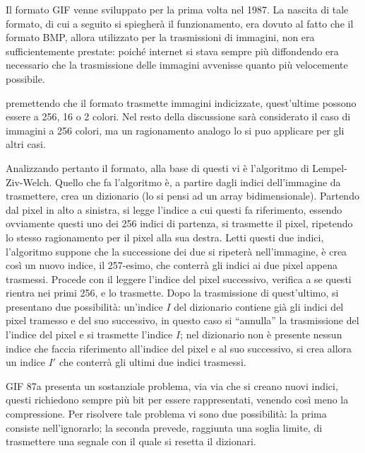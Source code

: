 \documentclass{subfiles}
\begin{document}
Il formato GIF venne sviluppato per la prima volta nel 1987. La nascita di tale formato, di cui a seguito si spiegherà il funzionamento,
era dovuto al fatto che il formato BMP, allora utilizzato per la trasmissioni di immagini, non era sufficientemente prestate:
poiché internet si stava sempre più diffondendo era necessario che la trasmissione delle immagini avvenisse quanto più velocemente possibile.

\begin{Note*}
    premettendo che il formato trasmette immagini indicizzate, quest'ultime possono essere a 256, 16 o 2 colori.
    Nel resto della discussione sarà considerato il caso di immagini a 256 colori, ma un ragionamento analogo lo si puo applicare per gli altri casi.
\end{Note*}

Analizzando pertanto il formato, alla base di questi vi è l'algoritmo di Lempel-Ziv-Welch.
Quello che fa l'algoritmo è, a partire dagli indici dell'immagine da trasmettere, crea un dizionario (lo si pensi ad un array bidimensionale).
Partendo dal pixel in alto a sinistra, si legge l'indice a cui questi fa riferimento, essendo ovviamente questi uno dei 256 indici di partenza,
si trasmette il pixel, ripetendo lo stesso ragionamento per il pixel alla sua destra. Letti questi due indici,
l'algoritmo suppone che la successione dei due si ripeterà nell'immagine, è crea così un nuovo indice, il 257-esimo, che conterrà gli indici ai due pixel appena trasmessi.
Procede con il leggere l'indice del pixel successivo, verifica a se questi rientra nei primi 256, e lo trasmette.
Dopo la trasmissione di quest'ultimo, si presentano due possibilità: un'indice \(I\) del dizionario contiene già gli indici del pixel tramesso e del suo successivo,
in questo caso si ``annulla'' la trasmissione del l'indice del pixel e si trasmette l'indice \(I\);
nel dizionario non è presente nessun indice che faccia riferimento all'indice del pixel e al suo successivo,
si crea allora un indice \(I'\) che conterrà gli ultimi due indici trasmessi.

\begin{Remark*}
    GIF 87a presenta un sostanziale problema, via via che si creano nuovi indici, questi richiedono sempre più bit per essere rappresentati,
    venendo così meno la compressione. Per risolvere tale problema vi sono due possibilità: la prima consiste nell'ignorarlo; la seconda prevede, raggiunta una soglia limite,
    di trasmettere una segnale con il quale si resetta il dizionari.
\end{Remark*}
\clearpage
\end{document}

